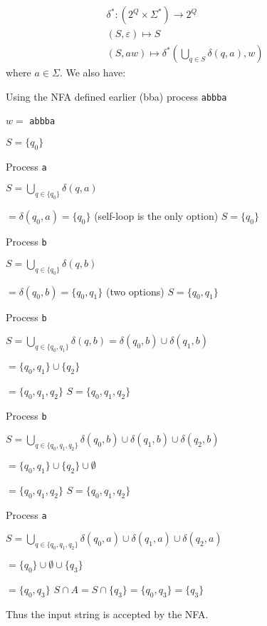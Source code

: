 \documentclass{article}
\begin{document}
\begin{align*}
\delta^*: (2^Q \times \Sigma^*) \to 2^Q \\
(S, \varepsilon) \mapsto S \\
(S, aw) \mapsto \delta^* \left ( \bigcup_{q \in S} \delta(q,a), w \right )
\end{align*}
 where \(a \in \Sigma\). We also have:


Using the NFA defined earlier (bba) process \texttt{abbba}

\(w =\) \texttt{abbba}

\(S = \{q_0\}\)

Process \texttt{a}

\(S = \bigcup_{q \in \{q_0\}} \delta(q, a)\)

\(= \delta(q_0, a) = \{q_0\}\) (self-loop is the only option) 
\(S = \{q_0\}\)

Process \texttt{b}

\(S = \bigcup_{q \in \{q_0\}} \delta(q, b)\)

\(= \delta(q_0, b) = \{q_0, q_1\}\) (two options)
\(S = \{q_0, q_1\}\)

Process \texttt{b}

\(S = \bigcup_{q \in \{q_0, q_1\}} \delta(q,b) = \delta(q_0, b) \cup \delta(q_1, b)\)

\(= \{q_0, q_1\} \cup \{q_2\}\)

\(= \{q_0, q_1, q_2\}\) \(S = \{q_0, q_1, q_2\}\)

Process \texttt{b}

\(S = \bigcup_{q \in \{q_0, q_1, q_2\}} \delta(q_0, b) \cup \delta(q_1, b) \cup \delta(q_2, b)\)

\(= \{q_0, q_1\} \cup \{q_2\} \cup \emptyset\)

\(= \{q_0, q_1, q_2\}\)  \(S = \{q_0, q_1, q_2\}\)

Process \texttt{a}

\(S = \bigcup_{q \in \{q_0, q_1, q_2\}} \delta(q_0, a) \cup \delta(q_1, a) \cup \delta(q_2, a)\)

\(= \{q_0\} \cup \emptyset \cup \{q_3\}\)

\(= \{q_0, q_3\}\) 
\(S \cap A = S \cap \{q_3\} = \{q_0, q_3\} =  \{q_3\}\)

Thus the input string is accepted by the NFA.

\end{document}
